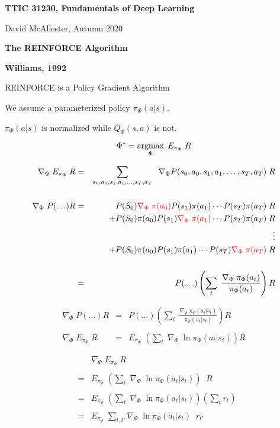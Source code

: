




{\Huge

  \centerline{\bf TTIC 31230, Fundamentals of Deep Learning}
  \bigskip
  \centerline{David McAllester, Autumn 2020}
  \vfill
  \centerline{\bf The REINFORCE Algorithm}
  \vfill
  \vfill  



\centerline{\bf Williams, 1992}

\vfill
REINFORCE is a Policy Gradient Algorithm

\vfill
We assume a parameterized policy $\pi_\Phi(a|s)$.

\vfill
$\pi_\Phi(a|s)$ is normalized while $Q_\Phi(s,a)$ is not.


$$\Phi^* = \operatorname*{argmax}_\Phi\; E_{\pi_\Phi} \; R$$

{\huge
\begin{eqnarray*}
  \nabla_\Phi \;E_{\pi_\Phi}\;R & = & \sum_{s_0,a_0,s_1,a_1,\ldots,s_T,a_T}\;\;\nabla_\Phi P(s_0,a_0,s_1,a_1,\ldots,s_T,a_T)\;R \\
  \\
  \nabla_\Phi \;P(\ldots)R & = & P(S_0){\color{red} \nabla_\Phi \;\pi(a_0)}P(s_1)\pi(a_1) \cdots P(s_T)\pi(a_T)\;R \\
  & & + P(S_0)\pi(a_0)P(s_1){\color{red} \nabla_\Phi\;\pi(a_1)} \cdots P(s_T)\pi(a_T)\;R \\
  & & \vdots \\
  & & + P(S_0)\pi(a_0)P(s_1)\pi(a_1) \cdots P(s_T){\color{red} \nabla_\Phi\;\pi(a_T)}\;R \\
  \\
  & = & P(\ldots) \left(\sum_t\;\frac{\nabla_\Phi\;\pi_\Phi(a_t)}{\pi_\Phi(a_t)}\right) R
\end{eqnarray*}
}


\begin{eqnarray*}
  \nabla_\Phi \;P(\ldots)R  & = & P(\ldots) \left(\sum_t\;\frac{\nabla_\Phi\;\pi_\Phi(a_t|s_t)}{\pi_\Phi(a_t|s_t)}\right) R \\
  \\
  \nabla_\Phi \;E_{\pi_\Phi}\;R & = & E_{\pi_\Phi}\;\left(\sum_t\;\nabla_\Phi\;\ln \pi_\Phi(a_t|s_t)\right) R
\end{eqnarray*}

\begin{eqnarray*}
 & &   \nabla_\Phi \; E_{\pi_\Phi}\; R \\
  \\
  & = & E_{\pi_\Phi}\;\left(\sum_t\;\nabla_\Phi\;\ln \pi_\Phi(a_t|s_t)\right)\;\;R \\
  \\
  & = & E_{\pi_\Phi}\; \left(\sum_t\;\nabla_\Phi\;\ln \pi_\Phi(a_t|s_t)\right)\left(\sum_{t} r_{t}\right)  \\
  \\
  & = & E_{\pi_\Phi}\; \sum_{t,t'} \nabla_\Phi\;\ln \pi_\Phi(a_{t}|s_{t}) \;\;r_{t'}
\end{eqnarray*}


}
